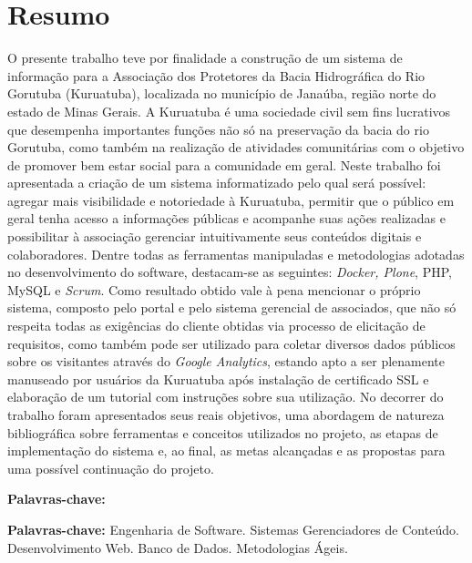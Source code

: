 \chapter*{Resumo}

\vspace{0.4cm}

\noindent O presente trabalho teve por finalidade a construção de um sistema de informação para a Associação dos Protetores da Bacia Hidrográfica do Rio Gorutuba (Kuruatuba), localizada no município de Janaúba, região norte do estado de Minas Gerais. 
A Kuruatuba é uma sociedade civil sem fins lucrativos que desempenha importantes funções não só na preservação da bacia do rio Gorutuba, como também na realização de atividades comunitárias com o objetivo de promover bem estar social para a comunidade em geral. 
Neste trabalho foi apresentada a criação de um sistema informatizado pelo qual será possível: agregar mais visibilidade e notoriedade à Kuruatuba, permitir que o público em geral tenha acesso a informações públicas e acompanhe suas ações realizadas e possibilitar à associação gerenciar intuitivamente seus conteúdos digitais e colaboradores.  
Dentre todas as ferramentas manipuladas e metodologias adotadas no desenvolvimento do software, destacam-se as seguintes: \textit{Docker, Plone}, PHP, MySQL e \textit{Scrum}.
Como resultado obtido vale à pena mencionar o próprio sistema, composto pelo portal e pelo sistema gerencial de associados, que não só respeita todas as exigências do cliente obtidas via processo de elicitação de requisitos, como também pode ser utilizado para coletar diversos dados públicos sobre os visitantes através do \textit{Google Analytics}, estando apto a ser plenamente manuseado por usuários da Kuruatuba após instalação de certificado SSL e elaboração de um tutorial com instruções sobre sua utilização.
No decorrer do trabalho foram apresentados seus reais objetivos, uma abordagem de natureza bibliográfica sobre ferramentas e conceitos utilizados no projeto, as etapas de implementação do sistema e, ao final, as metas alcançadas e as propostas para uma possível continuação do projeto.

\begin{labeling}{\textbf{Palavras-chave:}}
\item[\textbf{Palavras-chave:}] 
Engenharia de Software.
Sistemas Gerenciadores de Conteúdo.
Desenvolvimento Web.
Banco de Dados.
Metodologias Ágeis.
\end{labeling}

